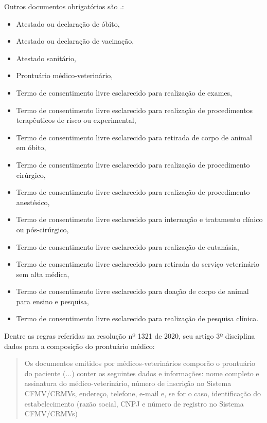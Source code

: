 \documentclass[
    12pt,               %
    openright,          %
    oneside,
    a4paper,            %
    BIBLATEX,           %
    TODO,               %
    english,            %
    brazil              %
    ]{ifsp-spo-inf-ctds}
\begin{document}
        Outros documentos obrigatórios são \cite{doc_obrig}.: 
    
        \begin{itemize}
            \item
            Atestado ou declaração de óbito,
            \item
            Atestado ou declaração de vacinação,
            \item
            Atestado sanitário,
            \item
            Prontuário médico-veterinário,
            \item
            Termo de consentimento livre esclarecido para realização de exames, 
            \item
            Termo de consentimento livre esclarecido para realização de procedimentos terapêuticos de risco ou experimental, 
            \item
            Termo de consentimento livre esclarecido para retirada de corpo de animal em óbito, 
            \item
            Termo de consentimento livre esclarecido para realização de procedimento cirúrgico, 
            \item
            Termo de consentimento livre esclarecido para realização de procedimento anestésico, 
            \item
            Termo de consentimento livre esclarecido para internação e tratamento clínico ou pós-cirúrgico, 
            \item
            Termo de consentimento livre esclarecido para realização de eutanásia, 
            \item
            Termo de consentimento livre esclarecido para retirada do serviço veterinário sem alta médica, 
            \item
            Termo de consentimento livre esclarecido para doação de corpo de animal para ensino e pesquisa, 
            \item
            Termo de consentimento livre esclarecido para realização de pesquisa clínica.
        \end{itemize}
    
        Dentre as regras referidas na resolução nº 1321 de 2020, seu artigo 3º disciplina dados para a composição do prontuário médico:
    
        \begin{quote}
            Os documentos emitidos por médicos-veterinários comporão o prontuário do paciente (...) conter os seguintes dados e informações: nome completo e assinatura do médico-veterinário, número de inscrição no Sistema CFMV/CRMVs, endereço, telefone, e-mail e, se for o caso, identificação do estabelecimento (razão social, CNPJ e número de registro no Sistema CFMV/CRMVs)
        \end{quote}
    
\end{document}
